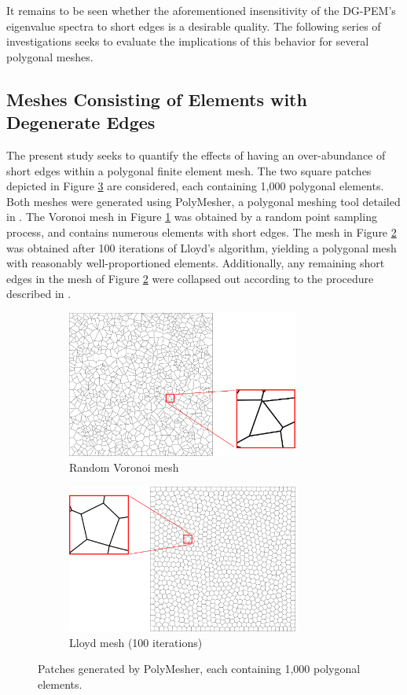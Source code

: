 It remains to be seen whether the aforementioned insensitivity of the DG-PEM's eigenvalue spectra to short edges is a desirable quality. The following series of investigations seeks to evaluate the implications of this behavior for several polygonal meshes.

\subsection*{Meshes Consisting of Elements with Degenerate Edges}

The present study seeks to quantify the effects of having an over-abundance of short edges within a polygonal finite element mesh. The two square patches depicted in Figure \ref{fig:polygonal_patches} are considered, each containing 1,000 polygonal elements. Both meshes were generated using PolyMesher, a polygonal meshing tool detailed in \cite{Talischi:12}. The Voronoi mesh in Figure \ref{fig:patch_mesh} was obtained by a random point sampling process, and contains numerous elements with short edges. The mesh in Figure \ref{fig:lloyd_mesh} was obtained after 100 iterations of Lloyd's algorithm, yielding a polygonal mesh with reasonably well-proportioned elements. Additionally, any remaining short edges in the mesh of Figure \ref{fig:lloyd_mesh} were collapsed out according to the procedure described in \cite{Talischi:12}.
\begin{figure}[!h]
    \centering
    \begin{subfigure}[b]{0.49\linewidth}
            \centering
            \includegraphics[width=3.0in]{figures/patch_mesh.pdf}
    			\caption{Random Voronoi mesh \label{fig:patch_mesh}}
    \end{subfigure}
	\begin{subfigure}[b]{0.49\linewidth}
            \centering
            \includegraphics[width=3.0in]{figures/lloyd_mesh.pdf}
    			\caption{Lloyd mesh (100 iterations) \label{fig:lloyd_mesh}}
    \end{subfigure}
    \caption{Patches generated by PolyMesher, each containing 1,000 polygonal elements.}
    \label{fig:polygonal_patches}
\end{figure}


